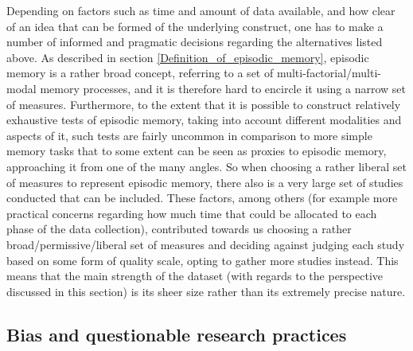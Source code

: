 Depending on factors such as time and amount of data available, and how clear of an idea that can be formed of the underlying construct, one has to make a number of informed and pragmatic decisions regarding the alternatives listed above. As described in section \ref{Definition_of_episodic_memory}, episodic memory is a rather broad concept, referring to a set of multi-factorial/multi-modal memory processes, and it is therefore hard to encircle it using a narrow set of measures. Furthermore, to the extent that it is possible to construct relatively exhaustive tests of episodic memory, taking into account different modalities and aspects of it, such tests are fairly uncommon in comparison to more simple memory tasks that to some extent can be seen as proxies to episodic memory, approaching it from one of the many angles. So when choosing a rather liberal set of measures to represent episodic memory, there also is a very large set of studies conducted that can be included. These factors, among others (for example more practical concerns regarding how much time that could be allocated to each phase of the data collection), contributed towards us choosing a rather broad/permissive/liberal set of measures and deciding against judging each study based on some form of quality scale, opting to gather more studies instead. This means that the main strength of the dataset (with regards to the perspective discussed in this section) is its sheer size rather than its extremely precise nature.

\subsection{Bias and questionable research practices} \label{Bias}

